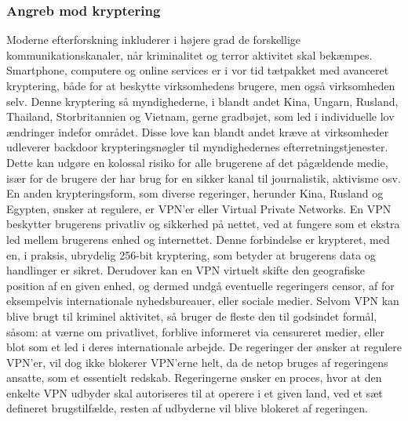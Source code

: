 \subsubsection{Angreb mod kryptering}
Moderne efterforskning inkluderer i højere grad de forskellige kommunikationskanaler, når kriminalitet og terror aktivitet skal bekæmpes. Smartphone, computere og online services er i vor tid tætpakket med avanceret kryptering, både for at beskytte virksomhedens brugere, men også virksomheden selv. Denne kryptering så myndighederne, i blandt andet Kina, Ungarn, Rusland, Thailand, Storbritannien og Vietnam, gerne gradbøjet, som led i individuelle lov ændringer indefor området. Disse love kan blandt andet kræve at virksomheder udleverer backdoor krypteringsnøgler til myndighedernes efterretningstjenester. Dette kan udgøre en kolossal risiko for alle brugerene af det pågældende medie, især for de brugere der har brug for en sikker kanal til journalistik, aktivisme osv.\cite{FreedomHouseRapport2017}\\
\noindent
En anden krypteringsform, som diverse regeringer, herunder Kina, Rusland og Egypten\cite{FreedomHouseRapport2017}, ønsker at regulere, er VPN'er eller Virtual Private Networks. En VPN beskytter brugerens privatliv og sikkerhed på nettet, ved at fungere som et ekstra led mellem brugerens enhed og internettet. Denne forbindelse er krypteret, med en, i praksis, ubrydelig 256-bit kryptering, som betyder at brugerens data og handlinger er sikret.\cite{VPNInfo} Derudover kan en VPN virtuelt skifte den geografiske position af en given enhed, og dermed undgå eventuelle regeringers censor, af for eksempelvis internationale nyhedsbureauer, eller sociale medier. Selvom VPN kan blive brugt til kriminel aktivitet, så bruger de fleste den til godsindet formål, såsom: at værne om privatlivet, forblive informeret via censureret medier, eller blot som et led i deres internationale arbejde. De regeringer der ønsker at regulere VPN'er, vil dog ikke blokerer VPN'erne helt, da de netop bruges af regeringens ansatte, som et essentielt redskab. Regeringerne ønsker en proces, hvor at den enkelte VPN udbyder skal autoriseres til at operere i et given land, ved et sæt defineret brugstilfælde, resten af udbyderne vil blive blokeret af regeringen.\cite{FreedomHouseRapport2017}
